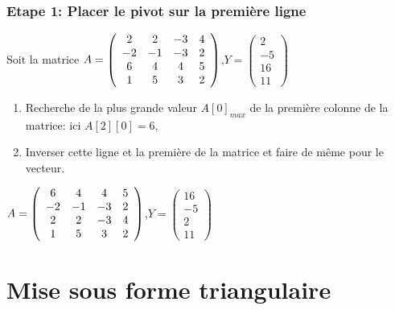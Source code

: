 \begin{frame}[fragile]
\frametitle{Etape 1: Placer le pivot sur la première ligne}

Soit la matrice $A=\left(\begin{array}{c c c c}
2 & 2 & -3 & 4 \\
-2 & -1 & -3 & 2 \\
6 & 4 & 4 & 5 \\
1 & 5 & 3 & 2
\end{array}\right)$,$Y=\left(\begin{array}{c}
2 \\
-5 \\
16 \\
11
\end{array}\right)$

\begin{enumerate}
 \item Recherche de la plus grande valeur $A[0]_{max}$ de la première colonne de la matrice: ici $A[2][0]=6$,
 \item Inverser cette ligne et la première de la matrice et faire de même pour le vecteur.
\end{enumerate}

$A=\left(\begin{array}{c c c c}
6 & 4 & 4 & 5 \\
-2 & -1 & -3 & 2 \\
2 & 2 & -3 & 4 \\
1 & 5 & 3 & 2
\end{array}\right)$,$Y=\left(\begin{array}{c}
16 \\
-5 \\
2 \\
11
\end{array}\right)$

\end{frame}

\section{Mise sous forme triangulaire}

